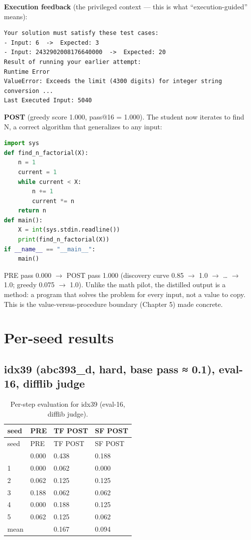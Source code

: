 \documentclass[12pt,a4paper]{report}
\begin{document}
\textbf{Execution feedback} (the privileged context --- this is what ``execution-guided'' means):

\begin{lstlisting}
Your solution must satisfy these test cases:
- Input: 6  ->  Expected: 3
- Input: 2432902008176640000  ->  Expected: 20
Result of running your earlier attempt:
Runtime Error
ValueError: Exceeds the limit (4300 digits) for integer string conversion ...
Last Executed Input: 5040
\end{lstlisting}

\textbf{POST} (greedy score 1.000, pass@16 = 1.000). The student now iterates to find N, a correct algorithm that generalizes to any input:

\begin{lstlisting}[language=Python]
import sys
def find_n_factorial(X):
    n = 1
    current = 1
    while current < X:
        n += 1
        current *= n
    return n
def main():
    X = int(sys.stdin.readline())
    print(find_n_factorial(X))
if __name__ == "__main__":
    main()
\end{lstlisting}

PRE pass 0.000 $\rightarrow$ POST pass 1.000 (discovery curve 0.85 $\rightarrow$ 1.0 $\rightarrow$ \ldots{} $\rightarrow$ 1.0; greedy 0.075 $\rightarrow$ 1.0). Unlike the math pilot, the distilled output is a method: a program that solves the problem for every input, not a value to copy. This is the value-versus-procedure boundary (Chapter 5) made concrete.

\chapter{Per-seed results}\label{appendix-e-per-seed-results}

\section{idx39 (abc393\_d, hard, base pass ≈ 0.1), eval-16, difflib judge}\label{e.1-idx39-abc393_d-hard-base-pass-0.1-eval-16-difflib-judge}

\begin{longtable}{llll}
\caption{Per-step evaluation for idx39 (eval-16, difflib judge).}\\
\toprule
seed & PRE & TF POST & SF POST \\
\midrule
\endfirsthead
\toprule
seed & PRE & TF POST & SF POST \\
\midrule
\endhead
\bottomrule
\endfoot
0 & 0.000 & 0.438 & 0.188 \\
1 & 0.000 & 0.062 & 0.000 \\
2 & 0.062 & 0.125 & 0.125 \\
3 & 0.188 & 0.062 & 0.062 \\
4 & 0.000 & 0.188 & 0.125 \\
5 & 0.062 & 0.125 & 0.062 \\
mean & & 0.167 & 0.094 \\
\end{longtable}
\end{document}
